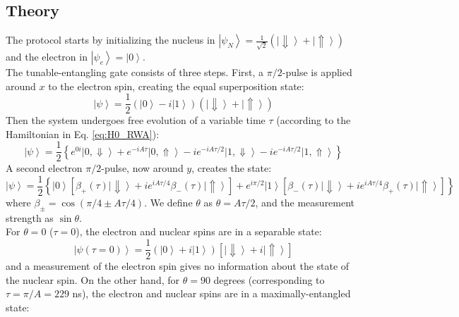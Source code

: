 \documentclass[12pt]{article}
\def\ket#1{\left|#1\right>}
\begin{document}
\subsection{Theory}
\label{sec:theory}
The protocol starts by initializing the nucleus in $\ket{\psi_N} = \frac{1}{\sqrt{2}} \left( \ket{\Downarrow}+\ket{\Uparrow} \right)$ and the electron in $\ket{\psi_e} = \ket{0}$.\\
The tunable-entangling gate consists of three steps. First, a $\pi/2$-pulse is applied around $x$ to the electron spin, creating the equal superposition state:
\begin{equation}
\left| \psi \right \rangle = \frac{1}{2} \left( \left| 0 \right \rangle - i \left| 1 \right \rangle \right) \left( \left| \Downarrow \right \rangle +\left| \Uparrow \right \rangle\right)
\end{equation}
Then the system undergoes free evolution of a variable time $\tau$ (according to the Hamiltonian in Eq. \ref{eq:H0_RWA}):
\begin{equation}
\ket{ \psi} = \frac{1}{2} \left \lbrace e^{0i} \ket{ 0, \Downarrow } + e^{-i A \tau} \ket{ 0, \Uparrow } - i  e^{-i A \tau/2} \ket{ 1, \Downarrow } - i  e^{-i A \tau/2} \ket{ 1, \Uparrow} \right \rbrace
\end{equation}
A second electron $\pi/2$-pulse, now around $y$, creates the state:
\begin{equation}
\left| \psi \right \rangle = \frac{1}{2} \left\lbrace \left| 0 \right \rangle \left[ \beta_+ (\tau) \left| \Downarrow \right \rangle + i e^{i A\tau/4} \beta_-(\tau) \left| \Uparrow \right \rangle \right] + e^{i\pi /2} \left| 1 \right \rangle \left[ \beta_-(\tau) \left| \Downarrow \right \rangle + i e^{i A\tau/4} \beta_+(\tau) \left| \Uparrow \right \rangle \right] \right\rbrace
\label{eq:state}
\end{equation}
where $\beta_{\pm} = \cos(\pi/4 \pm  A \tau/4)$. We define $\theta$ as $\theta= A \tau/2$, and the measurement strength as $\sin\theta$.\\
For $\theta=0$ ($\tau = 0$), the electron and nuclear spins are in a separable state:
\begin{equation}
\left| \psi (\tau=0) \right \rangle = \frac{1}{2} \left( \left| 0 \right \rangle +i \left| 1 \right \rangle \right) \left[ \left| \Downarrow \right \rangle +  i \left| \Uparrow \right \rangle \right]
\end{equation}
and a measurement of the electron spin gives no information about the state of the nuclear spin.
On the other hand, for $\theta = 90$ degrees (corresponding to $\tau = \pi/A = 229$ ns), the electron and nuclear spins are in a maximally-entangled state:
\end{document}
